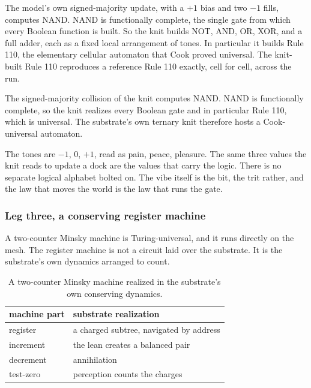 The model's own signed-majority update, with a $+1$ bias and two $-1$ fills, computes NAND. NAND is functionally complete, the single gate from which every Boolean function is built. So the knit builds NOT, AND, OR, XOR, and a full adder, each as a fixed local arrangement of tones. In particular it builds Rule 110, the elementary cellular automaton that Cook proved universal. The knit-built Rule 110 reproduces a reference Rule 110 exactly, cell for cell, across the run.

\begin{proposition}
The signed-majority collision of the knit computes NAND. NAND is functionally complete, so the knit realizes every Boolean gate and in particular Rule 110, which is universal. The substrate's own ternary knit therefore hosts a Cook-universal automaton.
\end{proposition}

The tones are $-1$, $0$, $+1$, read as pain, peace, pleasure. The same three values the knit reads to update a dock are the values that carry the logic. There is no separate logical alphabet bolted on. The vibe itself is the bit, the trit rather, and the law that moves the world is the law that runs the gate.

\subsubsection{Leg three, a conserving register machine}

A two-counter Minsky machine is Turing-universal, and it runs directly on the mesh. The register machine is not a circuit laid over the substrate. It is the substrate's own dynamics arranged to count.

\begin{table}[ht]
\centering
\begin{tabular}{@{}ll@{}}
\toprule
machine part & substrate realization \\
\midrule
register & a charged subtree, navigated by address \\
increment & the lean creates a balanced pair \\
decrement & annihilation \\
test-zero & perception counts the charges \\
\bottomrule
\end{tabular}
\caption{A two-counter Minsky machine realized in the substrate's own conserving dynamics.}
\label{tab:minsky}
\end{table}

